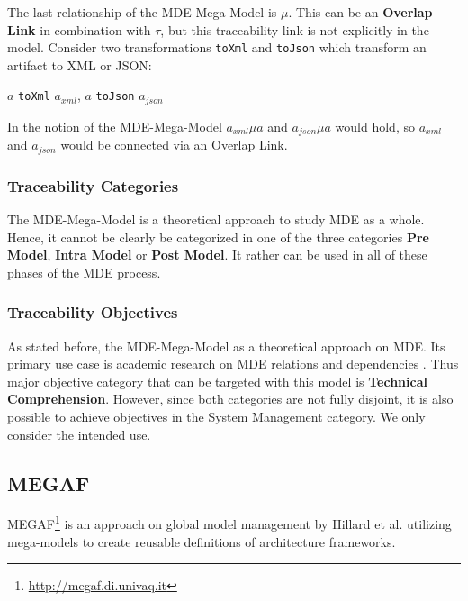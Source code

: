 \documentclass[runningheads,a4paper]{llncs}
\begin{document}
The last relationship of the MDE-Mega-Model is $\mu$.
This can be an \textbf{Overlap Link} in combination with $\tau$, but this traceability link is not explicitly in the model.
Consider two transformations \texttt{toXml} and \texttt{toJson} which transform an artifact to XML or JSON:
\begin{center}
$a$ \texttt{toXml} $a_{xml}$, $a$ \texttt{toJson} $a_{json}$
\end{center}
In the notion of the MDE-Mega-Model $a_{xml} \mu a$ and $a_{json} \mu a$ would hold, so $a_{xml}$ and $a_{json}$ would be connected via an Overlap Link.

\subsubsection{Traceability Categories}
The MDE-Mega-Model is a theoretical approach to study MDE as a whole.
Hence, it cannot be clearly be categorized in one of the three categories \textbf{Pre Model}, \textbf{Intra Model} or \textbf{Post Model}.
It rather can be used in all of these phases of the MDE process.

\subsubsection{Traceability Objectives}
As stated before, the MDE-Mega-Model as a theoretical approach on MDE.
Its primary use case is academic research on MDE relations and dependencies \cite{TowardsAMegamodel}.
Thus major objective category that can be targeted with this model is \textbf{Technical Comprehension}.
However, since both categories are not fully disjoint, it is also possible to achieve objectives in the System Management category.
We only consider the intended use.


\subsection{MEGAF}\label{subsec:ArchitectureFrameworkMegaModels}
MEGAF\footnote{\url{http://megaf.di.univaq.it}} is an approach on global model management by Hillard et al. \cite{MEGAF} utilizing mega-models to create reusable definitions of architecture frameworks.
\end{document}
